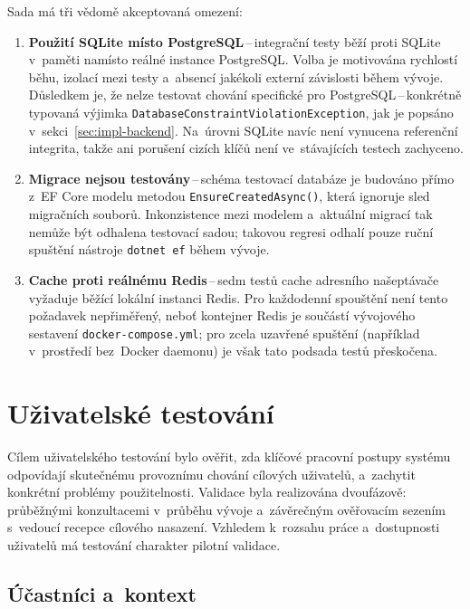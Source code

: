 Sada má tři vědomě akceptovaná omezení:
\begin{enumerate}
    \item \textbf{Použití SQLite místo PostgreSQL}\,--\,integrační testy běží proti SQLite v~paměti namísto reálné instance PostgreSQL.
        Volba je motivována rychlostí běhu, izolací mezi testy a~absencí jakékoli externí závislosti během vývoje.
        Důsledkem je, že nelze testovat chování specifické pro PostgreSQL\,--\,konkrétně typovaná výjimka \texttt{DatabaseConstraintViolationException}, jak je popsáno v~sekci~\ref{sec:impl-backend}.
        Na~úrovni SQLite navíc není vynucena referenční integrita, takže ani porušení cizích klíčů není ve~stávajících testech zachyceno.
    \item \textbf{Migrace nejsou testovány}\,--\,schéma testovací databáze je budováno přímo z~EF Core modelu metodou \texttt{EnsureCreatedAsync()}, která ignoruje sled migračních souborů.
        Inkonzistence mezi modelem a~aktuální migrací tak nemůže být odhalena testovací sadou; takovou regresi odhalí pouze ruční spuštění nástroje \texttt{dotnet~ef} během vývoje.
    \item \textbf{Cache proti reálnému Redis}\,--\,sedm testů cache adresního našeptávače vyžaduje běžící lokální instanci Redis.
        Pro každodenní spouštění není tento požadavek nepřiměřený, neboť kontejner Redis je součástí vývojového sestavení \texttt{docker-compose.yml}; pro zcela uzavřené spuštění (například v~prostředí bez~Docker daemonu) je však tato podsada testů přeskočena.
\end{enumerate}

\section{Uživatelské testování}
\label{sec:test-user}

Cílem uživatelského testování bylo ověřit, zda klíčové pracovní postupy systému odpovídají skutečnému provoznímu chování cílových uživatelů, a~zachytit konkrétní problémy použitelnosti.
Validace byla realizována dvoufázově: průběžnými konzultacemi v~průběhu vývoje a~závěrečným ověřovacím sezením s~vedoucí recepce cílového nasazení.
Vzhledem k~rozsahu práce a~dostupnosti uživatelů má testování charakter pilotní validace.

\subsection{Účastníci a~kontext}
\label{subsec:user-test-participant}

